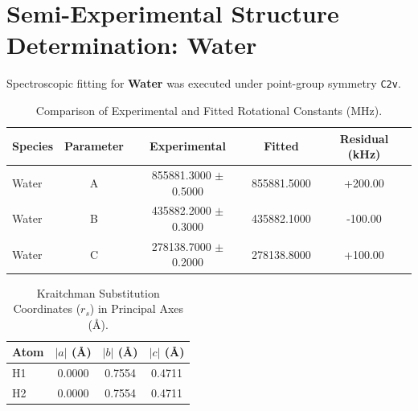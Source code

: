 \section{Semi-Experimental Structure Determination: Water}
Spectroscopic fitting for \textbf{Water} was executed under point-group symmetry \texttt{C2v}.

\begin{table}[h!]
\centering
\caption{Comparison of Experimental and Fitted Rotational Constants (MHz).}
\begin{tabular}{l c c c c}
\hline\hline
Species & Parameter & Experimental & Fitted & Residual (kHz) \\
\hline
Water & A & 855881.3000 $\pm$ 0.5000 & 855881.5000 & +200.00 \\
Water & B & 435882.2000 $\pm$ 0.3000 & 435882.1000 & -100.00 \\
Water & C & 278138.7000 $\pm$ 0.2000 & 278138.8000 & +100.00 \\
\hline\hline
\end{tabular}
\label{tab:rotational_constants}
\end{table}

\begin{table}[h!]
\centering
\caption{Kraitchman Substitution Coordinates ($r_s$) in Principal Axes (\AA).}
\begin{tabular}{l c c c}
\hline\hline
Atom & $|a|$ (\AA) & $|b|$ (\AA) & $|c|$ (\AA) \\
\hline
H1 & 0.0000 & 0.7554 & 0.4711 \\
H2 & 0.0000 & 0.7554 & 0.4711 \\
\hline\hline
\end{tabular}
\label{tab:kraitchman_rs}
\end{table}
